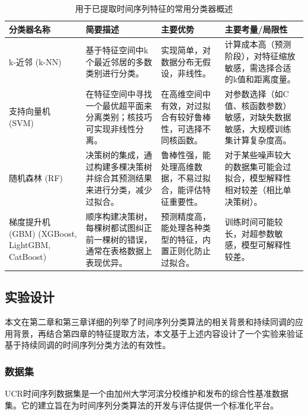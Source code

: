 \begin{table}[h!]
    \centering
    \caption{用于已提取时间序列特征的常用分类器概述}
    \label{tab:classifiers_condensed}
    \begin{tabular}{|p{2cm}|p{3.5cm}|p{4cm}|p{4.5cm}|}
        \hline
        \textbf{分类器名称}                            & \textbf{简要描述}                         & \textbf{主要优势}                 & \textbf{主要考量/局限性}                        \\
        \hline
        k-近邻 (k-NN)                               & 基于特征空间中k个最近邻居的多数类别进行分类。               & 实现简单，对数据分布无假设，非线性。            & 计算成本高（预测阶段），对特征缩放敏感，需选择合适的k值和距离度量。       \\
        \hline
        支持向量机 (SVM)                               & 在特征空间中寻找一个最优超平面来分离类别；核技巧可实现非线性分离。     & 在高维空间中有效，对过拟合有较好鲁棒性，可选择不同核函数。 & 对参数选择（如C值、核函数参数）敏感，对缺失数据敏感，大规模训练集计算复杂度高。 \\
        \hline
        随机森林 (RF)                                 & 决策树的集成，通过构建多棵决策树并综合其预测结果来进行分类，减少过拟合。  & 鲁棒性强，能处理高维数据，不易过拟合，能评估特征重要性。  & 对于某些噪声较大的数据集可能会过拟合，模型解释性相对较差（相比单决策树）。    \\
        \hline
        梯度提升机 (GBM) (XGBoost, LightGBM, CatBoost) & 顺序构建决策树，每棵树都试图纠正前一棵树的错误，通常在表格数据上表现优异。 & 预测精度高，能处理各种类型的特征，内置正则化防止过拟合。  & 训练时间可能较长，对超参数敏感，模型可解释性较差。                \\
        \hline
    \end{tabular}
\end{table}






\subsection{实验设计}
本文在第二章和第三章详细的列举了时间序列分类算法的相关背景和持续同调的应用背景，再结合第四章的特征提取方法，本文基于上述内容设计了一个实验来验证基于持续同调的时间序列分类方法的有效性。

\subsubsection{数据集}
UCR时间序列数据集\cite{UCRArchive2018}是一个由加州大学河滨分校维护和发布的综合性基准数据集。它的建立旨在为时间序列分类算法的开发与评估提供一个标准化平台。

